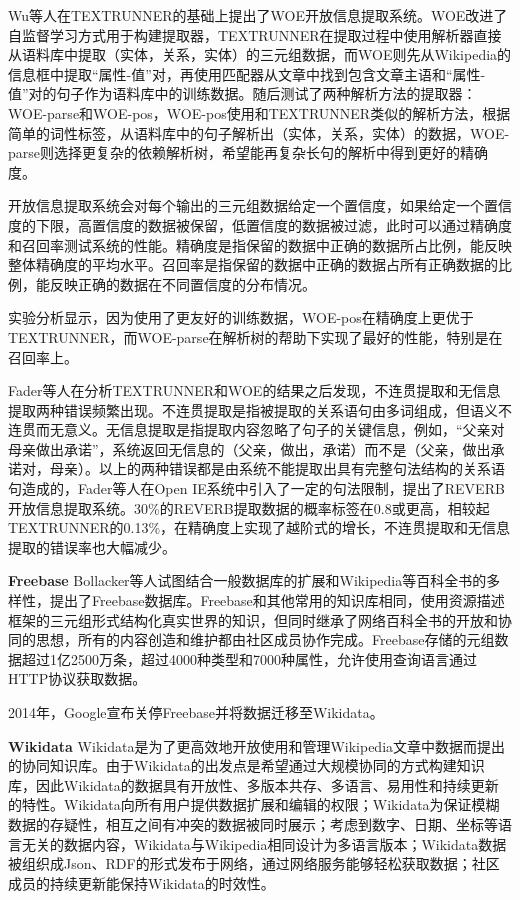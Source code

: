 Wu等人在TEXTRUNNER的基础上提出了WOE开放信息提取系统。WOE改进了自监督学习方式用于构建提取器，TEXTRUNNER在提取过程中使用解析器直接从语料库中提取（实体，关系，实体）的三元组数据，而WOE则先从Wikipedia的信息框中提取“属性-值”对，再使用匹配器从文章中找到包含文章主语和“属性-值”对的句子作为语料库中的训练数据。随后测试了两种解析方法的提取器：WOE-parse和WOE-pos，WOE-pos使用和TEXTRUNNER类似的解析方法，根据简单的词性标签，从语料库中的句子解析出（实体，关系，实体）的数据，WOE-parse则选择更复杂的依赖解析树，希望能再复杂长句的解析中得到更好的精确度。

开放信息提取系统会对每个输出的三元组数据给定一个置信度，如果给定一个置信度的下限，高置信度的数据被保留，低置信度的数据被过滤，此时可以通过精确度和召回率测试系统的性能。精确度是指保留的数据中正确的数据所占比例，能反映整体精确度的平均水平。召回率是指保留的数据中正确的数据占所有正确数据的比例，能反映正确的数据在不同置信度的分布情况。

实验分析显示，因为使用了更友好的训练数据，WOE-pos在精确度上更优于TEXTRUNNER，而WOE-parse在解析树的帮助下实现了最好的性能，特别是在召回率上。

Fader等人在分析TEXTRUNNER和WOE的结果之后发现，不连贯提取和无信息提取两种错误频繁出现。不连贯提取是指被提取的关系语句由多词组成，但语义不连贯而无意义。无信息提取是指提取内容忽略了句子的关键信息，例如，“父亲对母亲做出承诺”，系统返回无信息的（父亲，做出，承诺）而不是（父亲，做出承诺对，母亲）。以上的两种错误都是由系统不能提取出具有完整句法结构的关系语句造成的，Fader等人在Open IE系统中引入了一定的句法限制，提出了REVERB开放信息提取系统。30\%的REVERB提取数据的概率标签在0.8或更高，相较起TEXTRUNNER的0.13\%，在精确度上实现了越阶式的增长，不连贯提取和无信息提取的错误率也大幅减少。

\textbf{Freebase}
Bollacker等人试图结合一般数据库的扩展和Wikipedia等百科全书的多样性，提出了Freebase数据库。Freebase和其他常用的知识库相同，使用资源描述框架的三元组形式结构化真实世界的知识，但同时继承了网络百科全书的开放和协同的思想，所有的内容创造和维护都由社区成员协作完成。Freebase存储的元组数据超过1亿2500万条，超过4000种类型和7000种属性，允许使用查询语言通过HTTP协议获取数据。

2014年，Google宣布关停Freebase并将数据迁移至Wikidata。

\textbf{Wikidata}
Wikidata是为了更高效地开放使用和管理Wikipedia文章中数据而提出的协同知识库。由于Wikidata的出发点是希望通过大规模协同的方式构建知识库，因此Wikidata的数据具有开放性、多版本共存、多语言、易用性和持续更新的特性。Wikidata向所有用户提供数据扩展和编辑的权限；Wikidata为保证模糊数据的存疑性，相互之间有冲突的数据被同时展示；考虑到数字、日期、坐标等语言无关的数据内容，Wikidata与Wikipedia相同设计为多语言版本；Wikidata数据被组织成Json、RDF的形式发布于网络，通过网络服务能够轻松获取数据；社区成员的持续更新能保持Wikidata的时效性。

